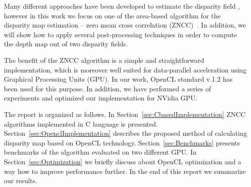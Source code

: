 \documentclass[conference]{IEEEtran}
\begin{document}
Many different approaches have been developed to estimate the disparity field \cite{Redert99}, however in this work we focus on one of the area-based algorithm for the disparity map estimation -- zero mean cross correlation (ZNCC)~\cite{aschwanden92}. In addition, we will show how to apply several post-processing techniques in order to compute the depth map out of two disparity fields. 

The benefit of the ZNCC algorithm is a simple and straightforward implementation, which is moreover well suited for data-parallel acceleration using Graphical Processing Units (GPU). In our work, OpenCL standard v.1.2 has been used for this purpose. In addition, we have performed a series of experiments and optimized our implementation for NVidia GPU.

The report is organized as follows. In Section~\ref{sec:CbasedImplementation} ZNCC algorithms implemented in C language is presented. Section~\ref{sec:OpenclImplementation} describes the proposed method of calculating disparity map based on OpenCL technology. Section~\ref{sec:Benchmarks} presents benchmarks of the algorithm evaluated on two different GPU. In Section~\ref{sec:Optimization} we briefly discuss about OpenCL optimization and a way how to improve performance further. In the end of this report we summarize our results.
\end{document}
